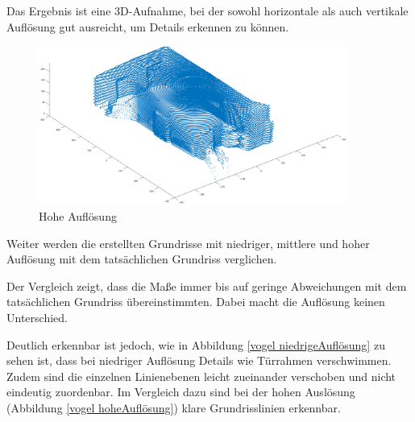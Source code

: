 Das Ergebnis ist eine 3D-Aufnahme, bei der sowohl horizontale als auch vertikale Auflösung gut ausreicht, um Details erkennen zu können.

\begin{figure}[H]
	\centering
	\includegraphics[width=0.9\textwidth]{images/Validierung/Aufloesungen/hoch.png}
	\caption{Hohe Auflösung}
	\label{hoch}
\end{figure}


Weiter werden die erstellten Grundrisse mit niedriger, mittlere und hoher Auflösung mit dem tatsächlichen Grundriss verglichen.

Der Vergleich zeigt, dass die Maße immer bis auf geringe Abweichungen mit dem tatsächlichen Grundriss übereinstimmten. Dabei macht die Auflösung keinen Unterschied. 

Deutlich erkennbar ist jedoch, wie in Abbildung \ref{vogel niedrigeAuflösung} zu sehen ist, dass bei niedriger Auflösung Details wie Türrahmen verschwimmen. Zudem sind die einzelnen Linienebenen leicht zueinander verschoben und nicht eindeutig zuordenbar.
Im Vergleich dazu sind bei der hohen Auslösung (Abbildung \ref{vogel hoheAuflösung}) klare Grundrisslinien erkennbar.


